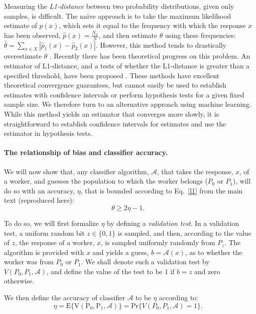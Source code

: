 \documentclass[12pt]{article}
\begin{document}
Measuring the \textit{L1-distance} between two probability distributions,
given only samples, is difficult.  The na\"ive approach is to take
the maximum likelihood estimate of $p(x)$, which sets it equal to the 
frequency with which the response $x$ has been observed, 
$\hat{p}(x) = \frac{N_x}{N}$, and then estimate $\theta$ 
using these frequencies\cite{batu2013testing}: 
$\hat{\theta} = \sum_{x \in X}|\hat{p}_1(x) - \hat{p}_2(x)|$.  
However, this method tends to drastically overestimate $\theta$
\cite{val-thesis}.
Recently there has been theoretical progress on this problem.
An estimator of L1-distance, and a tests of whether the L1-distance is
greater than a specified threshold, have been proposed 
\cite{val-thesis,batu2013testing,chan2014optimal}.  
These methods have excellent theoretical convergence guarantees, but
cannot easily be used to establish estimates with confidence intervals or 
perform hypothesis tests for a given fixed sample size.  
We therefore turn to an alternative approach using machine learning. 
While this method yields an estimator that converges more slowly,
it is straightforward to establish confidence intervals for estimates and 
use the estimator in hypothesis tests.

\paragraph{The relationship of bias and classifier accuracy.}
We will now show that, any classifier algorithm, $\mathcal{A}$, that
takes the response, $x$, of a worker, and guesses the population to which
the worker belongs ($P_0$ or $P_1$), will do so with an accuracy, $\eta$,
that is bounded according to Eq.~\ref{l1} from the main text 
(reproduced here):
\begin{equation}
	\theta \geq 2\eta - 1.
	\label{eq:sup:l1}
\end{equation}

To do so, we will first formalize $\eta$ by defining a 
\textit{validation test}.  In a validation test, a uniform random bit 
$z\in\{0,1\}$ is sampled, and then, according to the value of $z$, the
response of a worker, $x$, is sampled uniformly randomly from $P_z$.  
The algorithm is provided
with $x$ and yields a guess, $b=\mathcal{A}(x)$, as to whether the worker was 
from $P_0$ or $P_1$.  We shall denote such a validation test by 
$V(P_0, P_1, \mathcal{A})$, and define the value of the test to be 1 if 
$b=z$ and zero otherwise.  

We then define the accuracy of classifier $\mathcal{A}$ to be $\eta$ according
to:
\begin{equation}
\eta = \mathrm{E\{V(P_0, P_1, \mathcal{A})\}} 
	= \mathrm{Pr}\{V(P_0, P_1, \mathcal{A})=1\}.
\end{equation}
\end{document}
